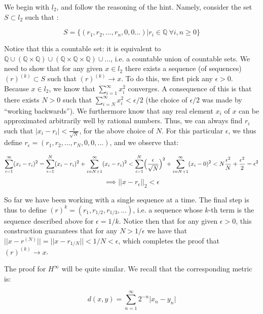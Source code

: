 \begin{solution}
    
    We begin with $l_2$, and follow the reasoning of the hint.
    Namely, consider the set $S \subset l_2$ such that :
    
    $$S = \{ (r_1, r_2, \ldots, r_n, 0, 0 \ldots) \lvert r_i \in \mathbb{Q} \ \forall i, n \geq 0\}$$

    Notice that this a countable set: it is equivalent to $\mathbb{Q} \cup (\mathbb{Q} \times \mathbb{Q}) \cup (\mathbb{Q} \times \mathbb{Q} \times \mathbb{Q}) \cup \ldots$, i.e. a countable union of countable sets.
    We need to show that for any given $x \in l_2$ there exists a sequence (of sequences) $(r)^{(k)} \subset S$ such that $(r)^{(k)} \rightarrow x$.
    To do this, we first pick any $\epsilon > 0$.
    Because $x \in l_2$, we know that $\sum_{i=1}^{\infty} x_i^2$ converges.
    A consequence of this is that there exists $N > 0$ such that $\sum_{i=N}^{\infty} x_i^2 < \epsilon/2$ (the choice of $\epsilon/2$ was made by ``working backwards'').
    We furthermore know that any real element $x_i$ of $x$ can be approximated arbitrarily well by rational numbers.
    Thus, we can always find $r_i$ such that $\lvert x_i - r_i \rvert < \frac{\epsilon}{\sqrt{N}}$, for the above choice of $N$.
    For this particular $\epsilon$, we thus define $r_{\epsilon} = (r_1, r_2, \ldots, r_N, 0, 0, \ldots)$, and we observe that:

    $$\sum_{i=1}^{\infty} (x_i - r_i)^2 = \sum_{i=1}^{N} (x_i - r_i)^2 + \sum_{i=N+1}^{\infty} (x_i - r_i)^2 < \sum_{i=1}^{N}\Bigl(\frac{\epsilon}{\sqrt{N}}\Bigr)^2 + \sum_{i=N+1}^{\infty} (x_ i - 0)^2 < N \frac{\epsilon^2}{N} + \frac{\epsilon^2}{2} = \epsilon^2$$
    $$\implies \lvert \lvert x - r_\epsilon \rvert \rvert_2 < \epsilon$$

    So far we have been working with a single sequence at a time.
    The final step is thus to define $(r)^{k} = (r_{1}, r_{1/2}, r_{1/3}, \ldots)$, i.e. a sequence whose $k$-th term is the sequence described above for $\epsilon = 1/k$.
    Notice then that for any given $\epsilon > 0$, this construction guarantees that for any $N > 1/\epsilon$ we have that $\lvert \lvert x - r^{(N)} \rvert \rvert = \lvert \lvert x - r_{1/N} \rvert \rvert < 1/N < \epsilon$, which completes the proof that $(r)^{(k)} \rightarrow x$.

    The proof for $H^{\infty}$ will be quite similar.
    We recall that the corresponding metric is:
    
    $$d(x, y) = \sum_{n=1}^{\infty} 2^{-n} \lvert x_n - y_n \rvert$$


\end{solution}
